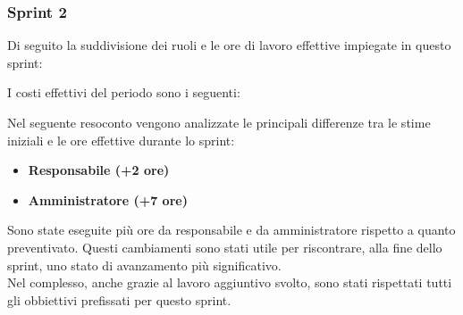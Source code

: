 \subsubsection{Sprint 2}
Di seguito la suddivisione dei ruoli e le ore di lavoro effettive impiegate in questo sprint:



I costi effettivi del periodo sono i seguenti:



Nel seguente resoconto vengono analizzate le principali differenze tra le stime iniziali e le ore effettive durante lo sprint:
\begin{itemize}
    \item \textbf{Responsabile (+2 ore)} 
    \item \textbf{Amministratore (+7 ore)}
\end{itemize}
Sono state eseguite più ore da responsabile e da amministratore rispetto a quanto preventivato. Questi cambiamenti sono stati utile per riscontrare, alla fine dello sprint, uno stato di avanzamento più significativo.
\\
Nel complesso, anche grazie al lavoro aggiuntivo svolto, sono stati rispettati tutti gli obbiettivi prefissati per questo sprint.


